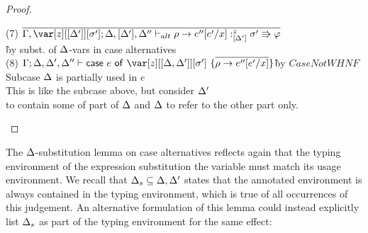 \begin{proof}
\begin{description}
\begin{tabbing}
    (7) $\ov{\G,\z[\irr{\D'}][\s']; \D,[\D'],\D'' \vdash_{alt} \rho \to e''[e'/x] :^z_{\irr{\D'}} \s'\Rrightarrow\vp}$\\\` by subst. of $\Delta$-vars in case alternatives\\
    (8) $\G; \D, \D', \D'' \vdash \ccase{e}{\z[\irr{\D,\D'}][\s']~\{\ov{\rho\to e''[e'/x]}\}}$\`by $CaseNotWHNF$\\
    Subcase $\Delta$ is partially used in $e$\\
    This is like the subcase above, but consider $\Delta'$\\
    to contain some of part of $\Delta$ and $\Delta$ to refer to the other part only.
\end{tabbing}

\end{description}

\end{proof}

The $\Delta$-substitution lemma on case alternatives reflects again that the typing
environment of the expression substitution the variable must match its usage
environment. We recall that $\Delta_s \subseteq \Delta,\Delta'$ states that the annotated
environment is always contained in the typing environment, which is true of all
occurrences of this judgement. An alternative formulation of this lemma could
instead explicitly list $\Delta_s$ as part of the typing environment for the same
effect:

\DeltaSubstitutionAltsLemma

